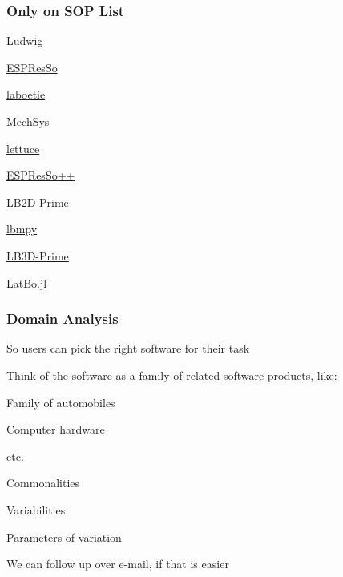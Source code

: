 \documentclass[t,12pt,numbers,fleqn]{beamer}
\begin{document}

\begin{frame}
\frametitle{Only on SOP List}

\begin{multicols}{2}	
  \bi
			\item \href{https://ludwig.epcc.ed.ac.uk/}{Ludwig}
			\item \href{http://espressomd.org/wordpress/}{ESPResSo}

			\item \href{https://github.com/maxlevesque/laboetie}{laboetie}
			\item \href{http://mechsys.nongnu.org/}{MechSys}
			\item \href{https://github.com/Olllom/lettuce}{lettuce}
			\item \href{https://github.com/espressopp/espressopp}{ESPResSo++} 

			\item \href{http://faculty.fiu.edu/~sukopm/LBnD_Prime/LBnD_Prime.html}{LB2D-Prime}	

			\item \href{https://pypi.org/project/lbmpy/}{lbmpy}	
			\item \href{http://faculty.fiu.edu/~sukopm/LBnD_Prime/LBnD_Prime.html}{LB3D-Prime}	
			\item \href{https://github.com/UCL/LatBo.jl}{LatBo.jl}
	\ei
\end{multicols}


\end{frame}


\begin{frame}
\frametitle{Domain Analysis}

\bi
\item So users can pick the right software for their task
\item Think of the software as a family of related software products, like:
\bi
\item Family of automobiles
\item Computer hardware
\item etc.
\ei
\item Commonalities
\item Variabilities
\item Parameters of variation
\item {}
\item We can follow up over e-mail, if that is easier
\ei

\end{frame}
\end{document}

